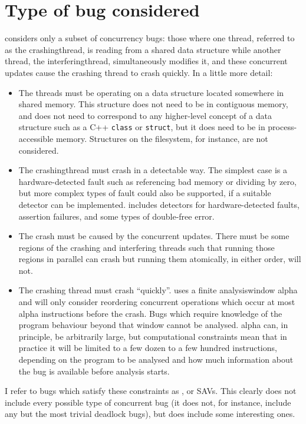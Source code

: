 \section{Type of bug considered}
\label{sect:types_of_bugs}

{\Technique} considers only a subset of concurrency bugs: those where
one thread, referred to as the \gls{crashingthread}, is reading from a
shared data structure while another thread, the
\gls{interferingthread}, simultaneously modifies it, and these
concurrent updates cause the crashing thread to crash quickly.  In a
little more detail:
\begin{itemize}
\item The threads must be operating on a data structure located
  somewhere in shared memory.  This structure does not need to be in
  contiguous memory, and does not need to correspond to any
  higher-level concept of a data structure such as a C++
  \texttt{class} or \texttt{struct}, but it does need to be in
  process-accessible memory.  Structures on the filesystem, for
  instance, are not considered.
\item The \gls{crashingthread} must crash in a detectable way.  The
  simplest case is a hardware-detected fault such as referencing bad
  memory or dividing by zero, but more complex types of fault could
  also be supported, if a suitable detector can be implemented.
  {\Implementation} includes detectors for hardware-detected faults,
  assertion failures, and some types of double-free error.
\item The crash must be caused by the concurrent updates.  There must
  be some regions of the crashing and interfering threads such that
  running those regions in parallel can crash but running them
  atomically, in either order, will not.
\item The crashing thread must crash ``quickly''.  {\Technique} uses a
  finite \gls{analysiswindow} \gls{alpha} and will only consider
  reordering concurrent operations which occur at most \gls{alpha}
  instructions before the crash.  Bugs which require knowledge of the
  program behaviour beyond that window cannot be analysed.
  \gls{alpha} can, in principle, be arbitrarily large, but
  computational constraints mean that in practice it will be limited
  to a few dozen to a few hundred instructions, depending on the
  program to be analysed and how much information about the bug is
  available before analysis starts.
\end{itemize}
I refer to bugs which satisfy these constraints as , or SAVs.  This
clearly does not include every possible type of concurrent bug (it
does not, for instance, include any but the most trivial deadlock
bugs), but does include some interesting ones.

